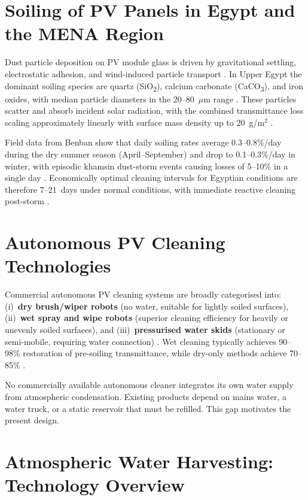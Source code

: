 \documentclass[12pt,a4paper]{report}   %
\begin{document}
\section{Soiling of PV Panels in Egypt and the MENA Region}

Dust particle deposition on PV module glass is driven by gravitational settling, electrostatic
adhesion, and wind-induced particle transport \cite{sarver2013pvsoiling}. In Upper Egypt the
dominant soiling species are quartz (SiO\textsubscript{2}), calcium carbonate (CaCO\textsubscript{3}),
and iron oxides, with median particle diameters in the 20--80~$\mu$m range
\cite{kazem2023soiling,caron2013soiling}. These particles scatter and absorb incident solar
radiation, with the combined transmittance loss scaling approximately linearly with surface mass
density up to 20~g/m$^2$ \cite{micheli2022benban}.

Field data from Benban show that daily soiling rates average 0.3--0.8\%/day during the dry summer
season (April--September) and drop to 0.1--0.3\%/day in winter, with episodic khamsin dust-storm
events causing losses of 5--10\% in a single day \cite{kazem2023soiling}. Economically optimal
cleaning intervals for Egyptian conditions are therefore 7--21~days under normal conditions, with
immediate reactive cleaning post-storm \cite{pan2022robotdesign}.

\section{Autonomous PV Cleaning Technologies}

Commercial autonomous PV cleaning systems are broadly categorised into: (i)~\textbf{dry
brush/wiper robots} (no water, suitable for lightly soiled surfaces), (ii)~\textbf{wet spray and
wipe robots} (superior cleaning efficiency for heavily or unevenly soiled surfaces), and
(iii)~\textbf{pressurised water skids} (stationary or semi-mobile, requiring water connection)
\cite{costa2021pvrobot,hasan2023cleaningrobot}. Wet cleaning typically achieves 90--98\%
restoration of pre-soiling transmittance, while dry-only methods achieve 70--85\%
\cite{mejia2021cleaning}.

No commercially available autonomous cleaner integrates its own water supply from atmospheric
condensation. Existing products depend on mains water, a water truck, or a static reservoir that
must be refilled. This gap motivates the present design.

\section{Atmospheric Water Harvesting: Technology Overview}
\end{document}
